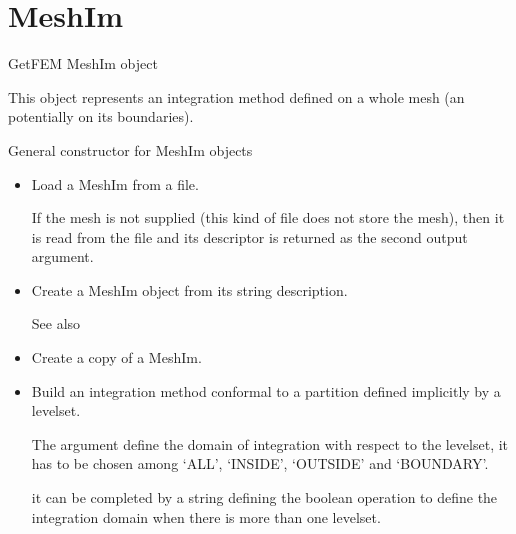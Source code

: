 \documentclass[a4paper,11pt,english]{sphinxmanual}
\begin{document}
\section{MeshIm}
\label{\detokenize{python/cmdref_MeshIm:meshim}}\label{\detokenize{python/cmdref_MeshIm::doc}}

\begin{fulllineitems}
\label{\detokenize{python/cmdref_MeshIm:getfem.MeshIm}}
GetFEM MeshIm object

This object represents an integration method defined on a whole mesh (an 
potentially on its boundaries).

General constructor for MeshIm objects
\begin{itemize}
\item {} 
Load a MeshIm from a file.

If the mesh  is not supplied (this kind of file does not store the
mesh), then it is read from the file and its descriptor is returned as
the second output argument.

\item {} 
Create a MeshIm object from its string description.

See also 

\item {} 
Create a copy of a MeshIm.

\item {} 
Build an integration method conformal to a partition defined
implicitly by a levelset.

The  argument define the domain of integration with respect to
the levelset, it has to be chosen among ‘ALL’, ‘INSIDE’, ‘OUTSIDE’ and
‘BOUNDARY’.

it can be completed by a string defining the boolean operation
to define the integration domain when there is more than one levelset.


\end{itemize}
\end{fulllineitems}
\end{document}

